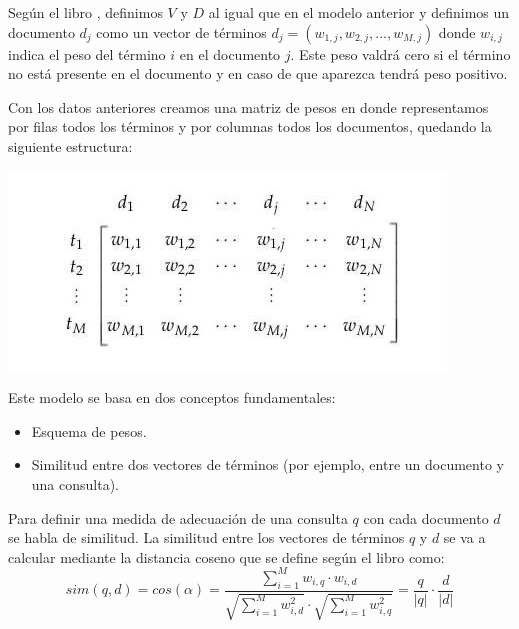 \documentclass[size=a4, parskip=half, titlepage=false, toc=flat, toc=bib, 12pt, twoside]{scrartcl}
\theoremstyle{theorem-style}
\theoremstyle{definition-style}
\theoremstyle{remark-style}
\theoremstyle{example-style}
\theoremstyle{definition-style}
\theoremstyle{remark-style}
\begin{document}
Según el libro \cite{ri}, definimos $V$ y $D$ al igual que en el modelo anterior y definimos un documento $d_j$ como un vector de términos $d_j = (w_{1,j}, w_{2,j}, \dots, w_{M,j})$ donde $w_{i,j}$ indica el peso del término $i$ en el documento $j$. Este peso valdrá cero si el término no está presente en el documento y en caso de que aparezca tendrá peso positivo.

Con los datos anteriores creamos una matriz de pesos en donde representamos por filas todos los términos y por columnas todos los documentos, quedando la siguiente estructura:

\begin{center}
\includegraphics[scale=0.6]{./img/matrizpesos}
\end{center}

Este modelo se basa en dos conceptos fundamentales:
\begin{itemize}
\item Esquema de pesos.
\item Similitud entre dos vectores de términos (por ejemplo, entre un documento y una consulta).
\end{itemize}
Para definir una medida de adecuación de una consulta $q$ con cada documento $d$ se habla de similitud. La similitud entre los vectores de términos $q$ y $d$ se va a calcular mediante la distancia coseno que se define según el libro \cite{ri} como:
$$sim(q,d) = cos(\alpha) = \frac{\sum_{i = 1}^M w_{i,q} \cdot w_{i,d}}{\sqrt{\sum_{i = 1}^M w_{i,d}^2} \cdot \sqrt{\sum_{i = 1}^M w_{i,q}^2}} = \frac{q}{|q|} \cdot \frac{d}{|d|} $$
\end{document}
